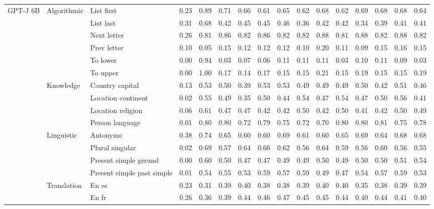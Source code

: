 \begin{center}
\begin{longtable}{lllrrrrrrrrrrrrr}
\multirow[t]{18}{*}{GPT-J 6B} & \multirow[t]{6}{*}{Algorithmic} & List first & 0.23 & 0.89 & 0.71 & 0.66 & 0.61 & 0.65 & 0.62 & 0.68 & 0.62 & 0.69 & 0.68 & 0.68 & 0.64 \\
 &  & List last & 0.31 & 0.68 & 0.42 & 0.45 & 0.45 & 0.46 & 0.36 & 0.42 & 0.42 & 0.34 & 0.39 & 0.41 & 0.41 \\
 &  & Next letter & 0.26 & 0.81 & 0.86 & 0.82 & 0.86 & 0.82 & 0.82 & 0.88 & 0.81 & 0.88 & 0.82 & 0.88 & 0.82 \\
 &  & Prev letter & 0.10 & 0.05 & 0.15 & 0.12 & 0.12 & 0.12 & 0.10 & 0.20 & 0.11 & 0.09 & 0.15 & 0.16 & 0.15 \\
 &  & To lower & 0.00 & 0.94 & 0.03 & 0.07 & 0.06 & 0.11 & 0.11 & 0.11 & 0.03 & 0.10 & 0.11 & 0.09 & 0.03 \\
 &  & To upper & 0.00 & 1.00 & 0.17 & 0.14 & 0.17 & 0.15 & 0.15 & 0.21 & 0.15 & 0.19 & 0.15 & 0.15 & 0.19 \\
\cline{2-16}
 & \multirow[t]{4}{*}{Knowledge} & Country capital & 0.13 & 0.53 & 0.50 & 0.39 & 0.53 & 0.53 & 0.49 & 0.49 & 0.49 & 0.50 & 0.42 & 0.51 & 0.46 \\
 &  & Location continent & 0.02 & 0.55 & 0.49 & 0.35 & 0.50 & 0.44 & 0.54 & 0.47 & 0.54 & 0.47 & 0.50 & 0.56 & 0.41 \\
 &  & Location religion & 0.06 & 0.61 & 0.47 & 0.47 & 0.42 & 0.42 & 0.50 & 0.42 & 0.50 & 0.41 & 0.42 & 0.50 & 0.49 \\
 &  & Person language & 0.01 & 0.80 & 0.80 & 0.72 & 0.79 & 0.75 & 0.72 & 0.70 & 0.80 & 0.80 & 0.81 & 0.75 & 0.78 \\
\cline{2-16}
 & \multirow[t]{4}{*}{Linguistic} & Antonyms & 0.38 & 0.74 & 0.65 & 0.60 & 0.60 & 0.69 & 0.61 & 0.60 & 0.65 & 0.69 & 0.64 & 0.68 & 0.68 \\
 &  & Plural singular & 0.02 & 0.69 & 0.57 & 0.64 & 0.66 & 0.62 & 0.56 & 0.64 & 0.59 & 0.56 & 0.60 & 0.56 & 0.55 \\
 &  & Present simple gerund & 0.00 & 0.60 & 0.50 & 0.47 & 0.47 & 0.49 & 0.49 & 0.50 & 0.49 & 0.50 & 0.50 & 0.51 & 0.54 \\
 &  & Present simple past simple & 0.01 & 0.54 & 0.55 & 0.53 & 0.59 & 0.57 & 0.59 & 0.49 & 0.47 & 0.54 & 0.57 & 0.59 & 0.53 \\
\cline{2-16}
 & \multirow[t]{4}{*}{Translation} & En es & 0.23 & 0.31 & 0.39 & 0.40 & 0.38 & 0.38 & 0.39 & 0.40 & 0.40 & 0.35 & 0.38 & 0.39 & 0.39 \\
 &  & En fr & 0.26 & 0.36 & 0.39 & 0.44 & 0.46 & 0.47 & 0.45 & 0.45 & 0.44 & 0.40 & 0.44 & 0.41 & 0.40 \\

\end{longtable}
\end{center}
